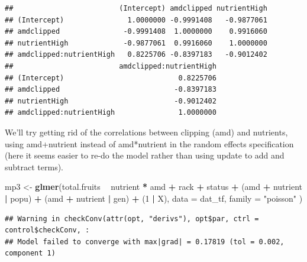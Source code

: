 \documentclass[
  12pt,
]{book}
\newenvironment{Shaded}{\begin{snugshade}}{\end{snugshade}}
\newcommand{\DataTypeTok}[1]{\textcolor[rgb]{0.13,0.29,0.53}{#1}}
\newcommand{\DecValTok}[1]{\textcolor[rgb]{0.00,0.00,0.81}{#1}}
\newcommand{\KeywordTok}[1]{\textcolor[rgb]{0.13,0.29,0.53}{\textbf{#1}}}
\newcommand{\NormalTok}[1]{#1}
\newcommand{\OperatorTok}[1]{\textcolor[rgb]{0.81,0.36,0.00}{\textbf{#1}}}
\newcommand{\StringTok}[1]{\textcolor[rgb]{0.31,0.60,0.02}{#1}}
\begin{document}
\begin{verbatim}
##                         (Intercept) amdclipped nutrientHigh
## (Intercept)               1.0000000 -0.9991408   -0.9877061
## amdclipped               -0.9991408  1.0000000    0.9916060
## nutrientHigh             -0.9877061  0.9916060    1.0000000
## amdclipped:nutrientHigh   0.8225706 -0.8397183   -0.9012402
##                         amdclipped:nutrientHigh
## (Intercept)                           0.8225706
## amdclipped                           -0.8397183
## nutrientHigh                         -0.9012402
## amdclipped:nutrientHigh               1.0000000
\end{verbatim}

We'll try getting rid of the correlations between clipping (amd) and nutrients, using amd+nutrient instead of amd*nutrient in the random effects specification (here it seems easier to re-do the model rather than using update to add and subtract terms).

\begin{Shaded}
\begin{Highlighting}[]
\NormalTok{mp3 <-}\StringTok{ }\KeywordTok{glmer}\NormalTok{(total.fruits }\OperatorTok{~}\StringTok{ }\NormalTok{nutrient }\OperatorTok{*}\StringTok{ }\NormalTok{amd }\OperatorTok{+}
\StringTok{  }\NormalTok{rack }\OperatorTok{+}\StringTok{ }\NormalTok{status }\OperatorTok{+}
\StringTok{  }\NormalTok{(amd }\OperatorTok{+}\StringTok{ }\NormalTok{nutrient }\OperatorTok{|}\StringTok{ }\NormalTok{popu) }\OperatorTok{+}
\StringTok{  }\NormalTok{(amd }\OperatorTok{+}\StringTok{ }\NormalTok{nutrient }\OperatorTok{|}\StringTok{ }\NormalTok{gen) }\OperatorTok{+}\StringTok{ }\NormalTok{(}\DecValTok{1} \OperatorTok{|}\StringTok{ }\NormalTok{X),}
\DataTypeTok{data =}\NormalTok{ dat_tf, }\DataTypeTok{family =} \StringTok{"poisson"}
\NormalTok{)}
\end{Highlighting}
\end{Shaded}

\begin{verbatim}
## Warning in checkConv(attr(opt, "derivs"), opt$par, ctrl = control$checkConv, :
## Model failed to converge with max|grad| = 0.17819 (tol = 0.002, component 1)
\end{verbatim}

\begin{Shaded}
\end{Shaded}
\end{document}
